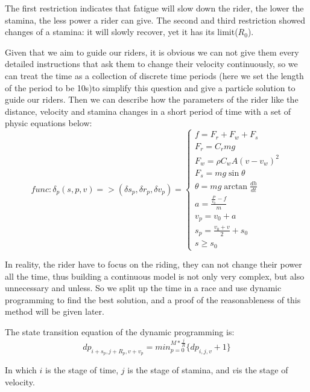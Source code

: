 \documentclass[12pt]{article}
\begin{document}
The first restriction indicates that fatigue will slow down the rider, the lower the stamina, the less power a rider can give. The second and third restriction
showed changes of a stamina: it will slowly recover, yet it has its limit($R_0$).

Given that we aim to guide our riders, it is obvious we can not give them every detailed instructions that ask them to change their velocity continuously, so we can treat the time
as a collection of discrete time periods (here we set the length of the period to be 10s)to simplify this question and give a particle solution to guide our riders.
Then we can describe how the parameters of the rider like the distance, velocity and stamina changes in a short period of time with a set of physic equations below:
\begin{equation}
    func: \delta_p(s,p,v)=>( \delta s_p,\delta r_p,\delta v_p)=\left\{
    \begin{array}{c}
        f=F_r+F_w+F_s                   \\
        F_r=C_rmg                       \\
        F_w=\rho C_w A(v-v_w)^2         \\
        F_s=mg\sin \theta               \\
        \theta=mg\arctan\frac{d h}{d t} \\
        a=\frac{\frac{P}{v_0}-f}{m}     \\
        v_p=v_0+a                       \\
        s_p=\frac{v_0+v}{2}+s_0         \\
        s\geqslant s_0
    \end{array}
    \right.
\end{equation}

In reality, the rider have to focus on the riding, they can not change their power all the time, thus building a continuous model is not only very complex,
but also unnecessary and unless. So we split up the time in a race and use dynamic programming to find the best solution,
and a proof of the reasonableness of this method will be given later.

The state transition equation of the dynamic programming is:$$dp_{i+s_p,j+R_p,v+v_p}= min_{p = 0}^{M*\frac{j}{R}}\{dp_{i,j,v}+1\}$$

In which $i$ is the stage of time, $j$ is the stage of stamina, and $v$is the stage of velocity.
\end{document}
